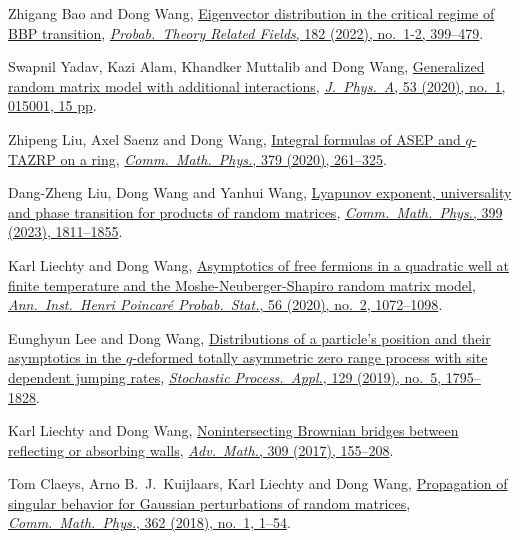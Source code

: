 \documentclass[12pt, a4paper]{article}
\begin{document}
\begin{etaremune}
  Zhigang Bao and Dong Wang, \href{https://arxiv.org/abs/2009.13143}{Eigenvector distribution in the critical regime of BBP transition}, \href{https://doi.org/10.1007/s00440-021-01062-4}{\textit{Probab.\ Theory  Related Fields}, 182 (2022), no.\ 1-2, 399--479}.
\item
  Swapnil Yadav, Kazi Alam, Khandker Muttalib and Dong Wang, \href{https://arxiv.org/abs/1908.03726}{Generalized random matrix model with additional interactions}, \href{https://dx.doi.org/10.1088/1751-8121/ab56e0}{\textit{J.\ Phys.\ A}, 53 (2020), no.\ 1, 015001, 15 pp}.
\item
  Zhipeng Liu, Axel Saenz and Dong Wang, \href{https://arxiv.org/abs/1905.02987}{Integral formulas of ASEP and $q$-TAZRP on a ring}, \href{https://doi.org/10.1007/s00220-020-03837-7}{\textit{Comm.\ Math.\ Phys.}, 379 (2020), 261--325}.
\item
  Dang-Zheng Liu, Dong Wang and Yanhui Wang, \href{https://arxiv.org/abs/1810.00433}{Lyapunov exponent, universality and phase transition for products of random matrices}, \href{https://doi.org/10.1007/s00220-022-04584-7}{\textit{Comm.\ Math.\ Phys.}, 399 (2023), 1811--1855}. 
\item
  Karl Liechty and Dong Wang, \href{https://arxiv.org/abs/1706.06653}{Asymptotics of free fermions in a quadratic well at finite temperature and the Moshe-Neuberger-Shapiro random matrix model}, \href{https://doi.org/10.1214/19-AIHP994}{\textit{Ann.\ Inst.\ Henri Poincar\'{e} Probab.\ Stat.}, 56 (2020), no.\ 2, 1072--1098}.
\item
  Eunghyun Lee and Dong Wang, \href{https://arxiv.org/abs/1703.08839}{Distributions of a particle's position and their asymptotics in the $q$-deformed totally asymmetric zero range process with site dependent jumping rates}, \href{https://doi.org/10.1016/j.spa.2018.06.005}{\textit{Stochastic Process.\ Appl.}, 129 (2019), no.\ 5, 1795--1828}.
\item
  Karl Liechty and Dong Wang, \href{http://arxiv.org/abs/1608.08712}{Nonintersecting Brownian bridges between reflecting or absorbing walls}, \href{https://doi.org/10.1016/j.aim.2016.10.024}{\textit{Adv.\ Math.}, 309 (2017), 155--208}.
\item
  Tom Claeys, Arno B.~J.~Kuijlaars, Karl Liechty and Dong Wang, \href{http://arxiv.org/abs/1608.05870}{Propagation of singular behavior for Gaussian perturbations of random matrices}, \href{https://doi.org/10.1007/s00220-018-3195-8}{\textit{Comm.\ Math.\ Phys.}, 362 (2018), no.\ 1, 1--54}.
\item

\end{etaremune}
\end{document}
